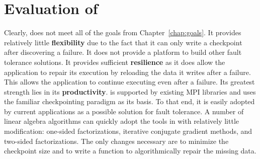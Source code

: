 \section{Evaluation of \cof}\label{sect:cof:evaluation}

Clearly, \cof does not meet all of the goals from Chapter~\ref{chap:goals}. It
provides relatively little \textbf{flexibility} due to the fact that it can only
write a checkpoint after discovering a failure. It does not provide a platform
to build other fault tolerance solutions. It provides sufficient \textbf{resilience} 
as it does allow the application to repair its execution by
reloading the data it writes after a failure. This allows the application to
continue executing even after a failure. Its greatest 
strength lies in its \textbf{productivity}. \cof is supported by existing MPI 
libraries and uses the familiar checkpointing paradigm as its basis. To that 
end, it is easily adopted by current applications as a possible solution for 
fault tolerance. A number of linear algebra algorithms can quickly adopt the tools in 
\cof with relatively little modification: one-sided factorizations, iterative conjugate 
gradient methods, and two-sided factorizations. The only changes necessary are to 
minimize the checkpoint size and to write a function to algorithmically repair the 
missing data. 
